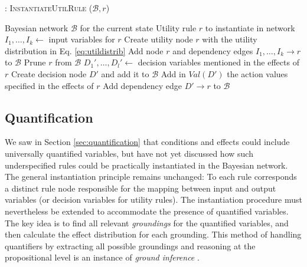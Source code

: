 \begin{algorithm}[h!]
\caption{: \textsc{InstantiateUtilRule} ($\mathcal{B}, \mathit{r}$)}
\begin{algorithmic}[1] \vspace{1mm}
\REQUIRE Bayesian network $\mathcal{B}$ for the current state
\REQUIRE Utility rule $\mathit{r}$ to instantiate in network  \vspace{1mm}
\STATE $I_1, \dots, I_k \leftarrow $ input variables for $r$
\STATE Create utility node $r$ with the utility distribution in Eq. \eqref{eq:utildistrib}
\STATE Add node $r$ and dependency edges $I_1, \dots, I_k \rightarrow r$ to $\mathcal{B}$ 
\STATE Prune $r$ from $\mathcal{B}$
\ELSE
\STATE $D_1', \dots, D_l' \leftarrow$ decision variables mentioned in the effects of $r$
\STATE Create decision node $D'$ and add it to $\mathcal{B}$
\ENDIF
\STATE Add in $\mathit{Val}(D')$ the action values specified in the effects of $r$
\STATE Add dependency edge $D' \rightarrow r$ to $\mathcal{B}$ 
\ENDFOR
\ENDIF
\end{algorithmic}
\label{algo:instantiateUtilRule}
\end{algorithm}

\subsection{Quantification}
\label{sec:applicationquantif}

We saw in Section \ref{sec:quantification} that conditions and effects could include universally quantified variables, but have not yet discussed how such underspecified rules could be practically instantiated in the Bayesian network. The general instantiation principle remains unchanged: To each rule corresponds a distinct rule node responsible for the mapping between input and output variables (or decision variables for utility rules). The instantiation procedure must nevertheless be extended to accommodate the presence of quantified variables.  The key idea is to find all relevant \textit{groundings} for the quantified variables, and then calculate the effect distribution for each grounding. This method of handling quantifiers by extracting all possible groundings and reasoning at the propositional level is an instance of \textit{ground inference} \citep{getoor:srlbook07}. 

